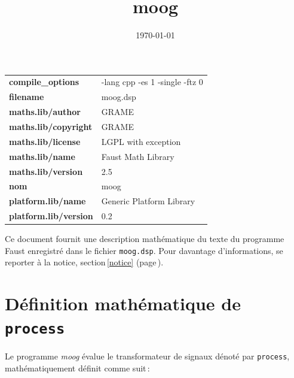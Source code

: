 \documentclass{article}
\newcommand{\faustfilename}{moog.dsp}
\newcommand{\faustprogname}{moog}
\begin{document}
\title{moog} \date{\today} \maketitle \begin{tabular}{ll}  \hline  \textbf{compile_options} & -lang cpp -es 1 -single -ftz 0 \\  \textbf{filename} & moog.dsp \\  \textbf{maths.lib/author} & GRAME \\  \textbf{maths.lib/copyright} & GRAME \\  \textbf{maths.lib/license} & LGPL with exception \\  \textbf{maths.lib/name} & Faust Math Library \\  \textbf{maths.lib/version} & 2.5 \\  \textbf{nom} & moog \\  \textbf{platform.lib/name} & Generic Platform Library \\  \textbf{platform.lib/version} & 0.2 \\  \hline \end{tabular} \bigskip  \bigskip Ce document fournit une description mathématique du texte du programme Faust enregistré dans le fichier \texttt{\faustfilename}. Pour davantage d'informations, se reporter à la notice, section\,\ref{notice} (page\,\pageref{notice}).   \section{Définition mathématique de \texttt{process}} \label{equation}  Le programme \emph{\faustprogname} évalue le transformateur de signaux dénoté par \texttt{process}, mathématiquement définit comme suit\,: 
\end{document}
